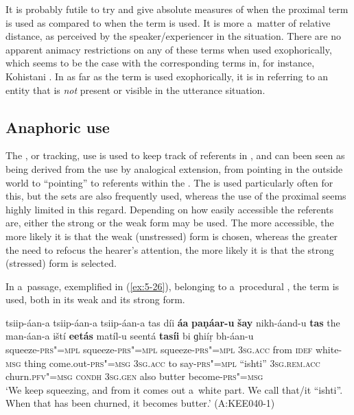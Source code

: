 It is probably futile to try and give absolute measures of when the proximal term is used as compared to when the  term is used. It is more a~matter of relative distance, as perceived by the speaker/experiencer in the situation. There are no apparent animacy restrictions on any of these terms when used exophorically, which seems to be the case with the corresponding terms in, for instance, Kohistani \iliShina \citep[135]{schmidtkohistani2001}. In as far as the  term is used exophorically, it is in referring to an entity that is \textit{not} present or visible in the utterance situation. 


\subsection{Anaphoric use}
\label{subsec:5-2-4}

The , or tracking, use is used to keep track of referents in , and can been seen as being derived from the  use by analogical extension, from pointing in the outside world to ``pointing'' to referents within the . The  is used particularly often for this, but the  sets are also frequently used, whereas the use of the proximal seems highly limited in this regard. Depending on how easily accessible the referents are, either the strong or the weak form may be used. The more accessible, the more likely it is that the weak (unstressed) form is chosen, whereas the greater the need to refocus the hearer's attention, the more likely it is that the strong (stressed) form is selected. 


In a~passage, exemplified in (\ref{ex:5-26}), belonging to a~procedural , the  term is used, both in its weak and its strong form.
 
\ea
\label{ex:5-26}
\gll tsiip-áan-a tsiip-áan-a tsiip-áan-a tas díi \textbf{áa} \textbf{paṇáar-u}
 \textbf{šay} nikh-áand-u \textbf{tas} the man-áan-a iští \textbf{eetás} matíl-u
seentá \textbf{tasíi} bi ɡhiíṛ bh-áan-u\\
squeeze-\textsc{prs"=mpl} squeeze-\textsc{prs"=mpl} squeeze-\textsc{prs"=mpl} \textsc{3sg.acc} from
\textsc{idef} white-\textsc{msg} thing come.out-\textsc{prs"=msg} \textsc{3sg.acc}
to say-\textsc{prs"=mpl} ``ishti'' \textsc{3sg.rem.acc} churn.\textsc{pfv"=msg}
\textsc{condh} \textsc{3sg.gen} also butter become-\textsc{prs"=msg}\\
\glt `We keep squeezing, and from it comes out a~white part. We call that/it ``ishti''. When that has been
churned, it becomes butter.' (A:KEE040-1)
\z

